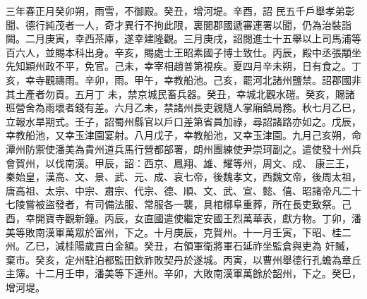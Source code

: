 \begin{pinyinscope}
 三年春正月癸卯朔，雨雪，不御殿。癸丑，增河堤。辛酉，詔
 民五千戶舉孝弟彰聞、德行純茂者一人，奇才異行不拘此限，裏閭郡國遞審連署以聞，仍為治裝詣闕。二月庚寅，幸西茶庫，遂幸建隆觀。三月庚戌，詔閱進士十五舉以上司馬浦等百六人，並賜本科出身。辛亥，賜處士王昭素國子博士致仕。丙辰，殿中丞張顒坐先知穎州政不平，免官。己未，幸宰相趙普第視疾。夏四月辛未朔，日有食之。丁亥，幸寺觀禱雨。辛卯，雨。甲午，幸教船池。己亥，罷河北諸州鹽禁。詔郡國非其土產者勿貢。五月丁
 未，禁京城民畜兵器。癸丑，幸城北觀水磑。癸亥，賜諸班營舍為雨壞者錢有差。六月乙未，禁諸州長吏親隨人掌廂鎮局務。秋七月乙巳，立報水旱期式。壬子，詔蜀州縣官以戶口差第省員加祿，尋詔諸路亦如之。戊辰，幸教船池，又幸玉津園宴射。八月戊子，幸教船池，又幸玉津園。九月己亥朔，命潭州防禦使潘美為貴州道兵馬行營都部署，朗州團練使尹崇珂副之。遣使發十州兵會賀州，以伐南漢。甲辰，詔：西京、鳳翔、雄、耀等州，周文、成、
 康三王，秦始皇，漢高、文、景、武、元、成、哀七帝，後魏孝文，西魏文帝，後周太祖，唐高祖、太宗、中宗、肅宗、代宗、德、順、文、武、宣、懿、僖、昭諸帝凡二十七陵嘗被盜發者，有司備法服、常服各一襲，具棺槨阜重葬，所在長吏致祭。己酉，幸開寶寺觀新鐘。丙辰，女直國遣使繼定安國王烈萬華表，獻方物。丁卯，潘美等敗南漢軍萬眾於富州，下之。十月庚辰，克賀州。十一月壬寅，下昭、桂二州。乙巳，減桂陽歲貢白金額。癸丑，右領軍衛將軍石延祚坐監倉與吏為
 奸贓，棄市。癸亥，定州駐泊都監田欽祚敗契丹於遂城。丙寅，以曹州舉德行孔蟾為章丘主簿。十二月壬申，潘美等下連州。辛卯，大敗南漢軍萬餘於韶州，下之。癸巳，增河堤。




\end{pinyinscope}
